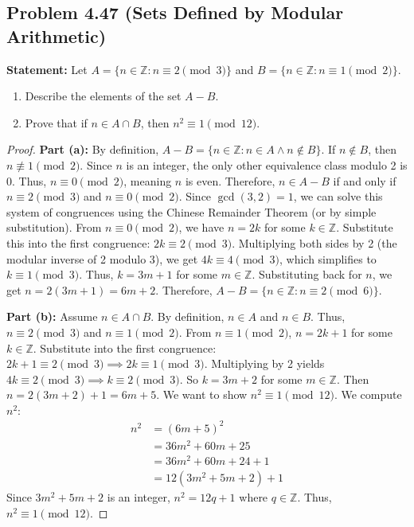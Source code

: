 \documentclass[11pt]{article}
\theoremstyle{definition}
\theoremstyle{remark}
\begin{document}
\subsection{Problem 4.47 (Sets Defined by Modular Arithmetic)}
\textbf{Statement:} Let $A = \{n \in \mathbb{Z} : n \equiv 2 \pmod 3\}$ and $B = \{n \in \mathbb{Z} : n \equiv 1 \pmod 2\}$.
\begin{enumerate}
    \item[(a)] Describe the elements of the set $A - B$.
    \item[(b)] Prove that if $n \in A \cap B$, then $n^2 \equiv 1 \pmod{12}$.
\end{enumerate}

\begin{proof}
\textbf{Part (a):} By definition, $A - B = \{n \in \mathbb{Z} : n \in A \land n \notin B\}$. 
If $n \notin B$, then $n \not\equiv 1 \pmod 2$. Since $n$ is an integer, the only other equivalence class modulo 2 is 0. Thus, $n \equiv 0 \pmod 2$, meaning $n$ is even.
Therefore, $n \in A - B$ if and only if $n \equiv 2 \pmod 3$ and $n \equiv 0 \pmod 2$.
Since $\gcd(3, 2) = 1$, we can solve this system of congruences using the Chinese Remainder Theorem (or by simple substitution). 
From $n \equiv 0 \pmod 2$, we have $n = 2k$ for some $k \in \mathbb{Z}$. 
Substitute this into the first congruence: $2k \equiv 2 \pmod 3$. 
Multiplying both sides by 2 (the modular inverse of 2 modulo 3), we get $4k \equiv 4 \pmod 3$, which simplifies to $k \equiv 1 \pmod 3$. 
Thus, $k = 3m + 1$ for some $m \in \mathbb{Z}$. 
Substituting back for $n$, we get $n = 2(3m + 1) = 6m + 2$. 
Therefore, $A - B = \{n \in \mathbb{Z} : n \equiv 2 \pmod 6\}$.

\textbf{Part (b):} Assume $n \in A \cap B$. By definition, $n \in A$ and $n \in B$. 
Thus, $n \equiv 2 \pmod 3$ and $n \equiv 1 \pmod 2$. 
From $n \equiv 1 \pmod 2$, $n = 2k + 1$ for some $k \in \mathbb{Z}$. 
Substitute into the first congruence: $2k + 1 \equiv 2 \pmod 3 \implies 2k \equiv 1 \pmod 3$. 
Multiplying by 2 yields $4k \equiv 2 \pmod 3 \implies k \equiv 2 \pmod 3$. 
So $k = 3m + 2$ for some $m \in \mathbb{Z}$. 
Then $n = 2(3m + 2) + 1 = 6m + 5$. 
We want to show $n^2 \equiv 1 \pmod{12}$. We compute $n^2$:
\begin{align*}
n^2 &= (6m + 5)^2 \\
    &= 36m^2 + 60m + 25 \\
    &= 36m^2 + 60m + 24 + 1 \\
    &= 12(3m^2 + 5m + 2) + 1
\end{align*}
Since $3m^2 + 5m + 2$ is an integer, $n^2 = 12q + 1$ where $q \in \mathbb{Z}$. 
Thus, $n^2 \equiv 1 \pmod{12}$.
\end{proof}
\end{document}

